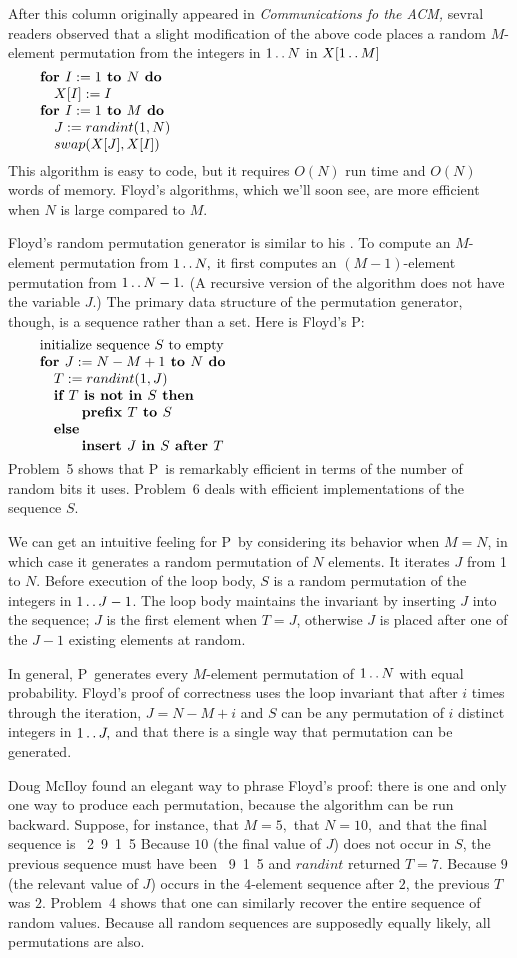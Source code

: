 After this column originally appeared in {\sl Communications fo the ACM,\/}
sevral readers observed that a slight modification of the above code places a
random $M$-element permutation from the integers in $1\mathinner{\ldotp\ldotp} N$ in
$X[1\mathinner{\ldotp\ldotp} M]$
$$\vbox{\let\par=\endgraf
\obeylines\sfcode`;=3000
{\bf for $I:=1$ to $N$ do}
\quad $X[I]:=I$
{\bf for $I:=1$ to $M$ do}
\quad $J:= randint(1, N)$
\quad $swap(X[J], X[I])$
}$$
This algorithm is easy to code, but it requires $O(N)$ run time and $O(N)$ words
of memory. Floyd's algorithms, which we'll soon see, are more efficient when $N$
is large compared to $M$.

Floyd's random permutation generator is similar to his . To compute an
$M$-element permutation from $1\mathinner{\ldotp\ldotp} N,$ it first computes an $(M-1)$-element
permutation from $1\mathinner{\ldotp\ldotp} N-1.$ (A recursive version of the algorithm does not
have the variable $J.$) The primary data structure of the permutation generator,
though, is a sequence rather than a set. Here is Floyd's \alg P:
$$\vbox{\let\par=\endgraf
\obeylines\sfcode`;=3000
initialize sequence $S$ to empty
{\bf for $J:=N-M+1$ to $N$ do}
\quad $T:=randint(1,J)$
\quad {\bf if $T$ is not in $S$ then}
\qquad\quad {\bf prefix $T$ to $S$}
\quad {\bf else}
\qquad\quad {\bf insert $J$ in $S$ after $T$}
}$$
Problem~5 shows that \alg P\ is remarkably efficient in terms of the number of
random bits it uses. Problem~6 deals with efficient implementations of the
sequence $S.$

We can get an intuitive feeling for \alg P\ by considering its behavior when
$M=N$, in which case it generates a random permutation of $N$ elements. It
iterates $J$ from 1 to $N$. Before execution of the loop body, $S$ is a random
permutation of the integers in $1\mathinner{\ldotp\ldotp} J-1$. The loop body maintains the
invariant by inserting $J$ into the sequence; $J$ is the first element when
$T=J$, otherwise $J$ is placed after one of the $J-1$ existing elements at random.

In general, \alg P\ generates every $M$-element permutation of $1\mathinner{\ldotp\ldotp} N$ with
equal probability. Floyd's proof of correctness uses the loop invariant that
after $i$ times through the iteration, $J=N-M+i$ and $S$ can be any permutation
of $i$ distinct integers in $1\mathinner{\ldotp\ldotp} J,$ and that there is a single way that
permutation can be generated.

Doug McIloy found an elegant way to phrase Floyd's proof: there is one and only
one way to produce each permutation, because the algorithm can be run backward.
Suppose, for instance, that $M=5,$ that $N=10,$ and that the final sequence is
\ 2\ 9\ 1\ 5
\enddisplay
Because $10$ (the final value of $J$) does not occur in $S$, the previous
sequence must have been
\ 9\ 1\ 5
\enddisplay
and $randint$ returned $T=7.$ Because $9$ (the relevant value of $J$) occurs in
the $4$-element sequence after $2$, the previous $T$ was $2$. Problem~4 shows
that one can similarly recover the entire sequence of random values. Because all
random sequences are supposedly equally likely, all permutations are also.

